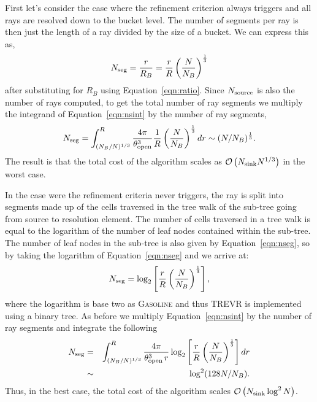 \documentclass[fleq,usenatbib]{mnras}
\newcommand{\acro}{TREVR}
\newcommand{\bigO}[1]{\mathcal{O}\left(#1\right)}
\newcommand{\NS}{N_{\rm source}}
\newcommand{\NK}{N_{\rm sink}}
\newcommand{\tO}{\theta_{\rm open}}
\begin{document}
{First let's consider the case where the refinement criterion always triggers and 
all rays are resolved down to the bucket level. The number of segments per ray 
is then just the length of a ray divided by the size of a bucket. We can 
express this as,
\begin{equation}
\label{eqn:nseg}
N_{\rm seg} = \frac{r}{R_B} = \frac{r}{R}\left(\frac{N}{N_B}\right)^\frac{1}{3}
\end{equation}
after substituting for $R_B$ using Equation~\ref{eqn:ratio}. Since $\NS$ is 
also the number of rays computed, to get the total number of ray segments we
multiply the integrand of 
Equation~\ref{eqn:nsint} by the number of ray segments,
\begin{equation}
\label{eqn:nsegint}
N_{\rm seg} = \int_{(N_B/N)^{1/3}}^R 
\frac{4\pi}{\tO^3}
\frac{1}{R}\left(\frac{N}{N_B}\right)^\frac{1}{3} dr
\sim (N/N_B)^\frac{1}{3}.
\end{equation}
The result is that the total cost of the algorithm scales as
$\bigO{\NK N^{1/3}}$ in the worst case.

In the case were the refinement criteria never triggers, the ray is split into 
segments made up of the cells traversed in the tree walk of the sub-tree going 
from source to resolution element. The number of cells traversed in a tree walk
is equal to the logarithm of the number of leaf nodes contained within the 
sub-tree. The number of leaf nodes in the sub-tree is also given by 
Equation~\ref{eqn:nseg}, so by taking the logarithm of Equation~\ref{eqn:nseg} 
and we arrive at:
\begin{equation}
\label{eqn:nseg2}
N_{\rm seg} = \log_2\left[\frac{r}{R}\left(
\frac{N}{N_B}\right)^\frac{1}{3}\right],
\end{equation}
where the logarithm is base two as \textsc{Gasoline} and thus \acro{} is 
implemented using a binary tree. As before we multiply 
Equation~\ref{eqn:nsint} by the number of ray segments and integrate the 
following
\begin{eqnarray}
\label{eqn:nsegint2}
N_{\rm seg} & = & \int_{(N_B/N)^{1/3}}^R 
\frac{4\pi}{\tO^3\, r}
\log_2\left[\frac{r}{R}\left(
\frac{N}{N_B}\right)^\frac{1}{3}\right] dr \nonumber\\
& \sim & \log^2(128 N/N_B).
\end{eqnarray}
Thus, in the best case, the total cost of the algorithm scales 
$\bigO{\NK \log^2N}$.

}
\end{document}
